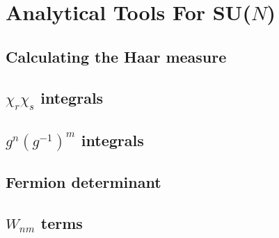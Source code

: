 \chapter{Analytical Tools For SU(\texorpdfstring{$N$}{N})}

\section{Calculating the Haar measure} \label{sec-haar_measure}
\section{\texorpdfstring{$\chi_r \chi_s$}{Ln Lm} integrals} \label{sec-character_integrals}
\section{\texorpdfstring{$g^n (g^{-1})^m$}{Un Udm} integrals} \label{sec-sun_integrals}
\section{Fermion determinant}
\section{\texorpdfstring{$W_{nm}$}{Wnm} terms}
